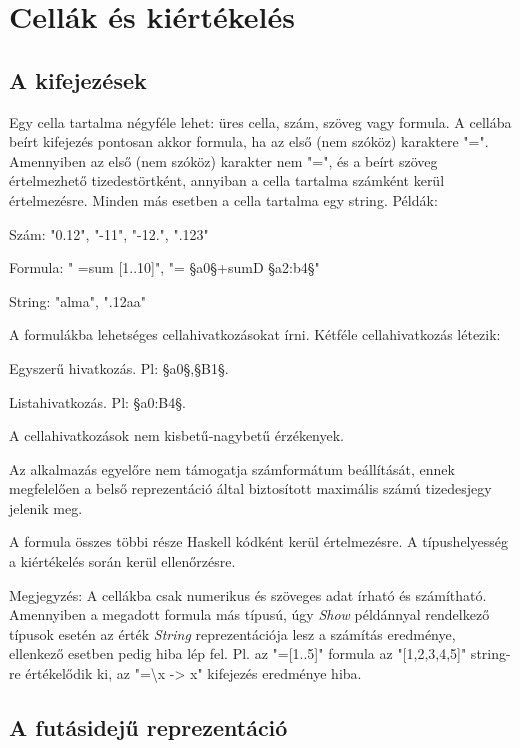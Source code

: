 \section{Cellák és kiértékelés}

\subsection{A kifejezések}

Egy cella tartalma négyféle lehet: üres cella, szám, szöveg vagy formula. A cellába beírt kifejezés pontosan akkor formula, ha az első (nem szóköz) karaktere "=". Amennyiben az első (nem szóköz) karakter nem "=", és a beírt szöveg értelmezhető tizedestörtként, annyiban a cella tartalma számként kerül értelmezésre. Minden más esetben a cella tartalma egy string. Példák:
\begin{compactenum}
	\item Szám: "0.12", "-11", "-12.", ".123"
	\item Formula: " =sum [1..10]", "= §a0§+sumD §a2:b4§"
	\item String: "alma", ".12aa"
\end{compactenum}

A formulákba lehetséges cellahivatkozásokat írni. Kétféle cellahivatkozás létezik:
\begin{compactenum}
	\item Egyszerű hivatkozás. Pl: §a0§,§B1§.
	\item Listahivatkozás. Pl: §a0:B4§.
\end{compactenum}

A cellahivatkozások nem kisbetű-nagybetű érzékenyek.

Az alkalmazás egyelőre nem támogatja számformátum beállítását, ennek megfelelően a belső reprezentáció által biztosított maximális számú tizedesjegy jelenik meg.

A formula összes többi része Haskell kódként kerül értelmezésre. A típushelyesség a kiértékelés során kerül ellenőrzésre.

Megjegyzés: A cellákba csak numerikus és szöveges adat írható és számítható. Amennyiben a megadott formula más típusú, úgy \textit{Show} példánnyal rendelkező típusok esetén az érték \textit{String} reprezentációja lesz a számítás eredménye, ellenkező esetben pedig hiba lép fel. Pl. az "=[1..5]" formula az "[1,2,3,4,5]" string-re értékelődik ki, az "=\textbackslash x -> x" kifejezés eredménye hiba.

\subsection{A futásidejű reprezentáció}

